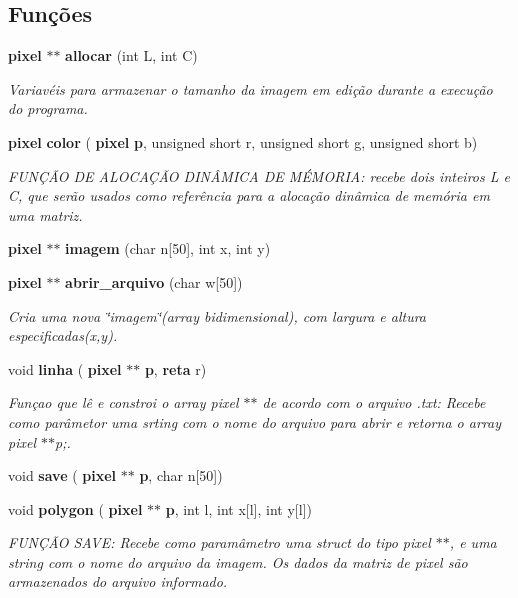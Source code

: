 \subsection*{Funções}
\begin{DoxyCompactItemize}
\item 
\textbf{ pixel} $\ast$$\ast$ \textbf{ allocar} (int L, int C)
\begin{DoxyCompactList}\small\item\em Variavéis para armazenar o tamanho da imagem em edição durante a execução do programa. \end{DoxyCompactList}\item 
\textbf{ pixel} \textbf{ color} (\textbf{ pixel} \textbf{ p}, unsigned short r, unsigned short g, unsigned short b)
\begin{DoxyCompactList}\small\item\em F\+U\+NÇÃO DE A\+L\+O\+C\+AÇÃO D\+I\+NÂ\+M\+I\+CA DE MÉ\+M\+O\+R\+IA\+: recebe dois inteiros L e C, que serão usados como referência para a alocação dinâmica de memória em uma matriz. \end{DoxyCompactList}\item 
\textbf{ pixel} $\ast$$\ast$ \textbf{ imagem} (char n[50], int x, int y)
\item 
\textbf{ pixel} $\ast$$\ast$ \textbf{ abrir\+\_\+arquivo} (char w[50])
\begin{DoxyCompactList}\small\item\em Cria uma nova \char`\"{}imagem\char`\"{}(array bidimensional), com largura e altura especificadas(x,y). \end{DoxyCompactList}\item 
void \textbf{ linha} (\textbf{ pixel} $\ast$$\ast$\textbf{ p}, \textbf{ reta} r)
\begin{DoxyCompactList}\small\item\em Funçao que lê e constroi o array pixel $\ast$$\ast$ de acordo com o arquivo .txt\+: Recebe como parâmetor uma srting com o nome do arquivo para abrir e retorna o array pixel $\ast$$\ast$p;. \end{DoxyCompactList}\item 
void \textbf{ save} (\textbf{ pixel} $\ast$$\ast$\textbf{ p}, char n[50])
\item 
void \textbf{ polygon} (\textbf{ pixel} $\ast$$\ast$\textbf{ p}, int l, int x[l], int y[l])
\begin{DoxyCompactList}\small\item\em F\+U\+NÇÃO S\+A\+VE\+: Recebe como paramâmetro uma struct do tipo pixel $\ast$$\ast$, e uma string com o nome do arquivo da imagem. Os dados da matriz de pixel são armazenados do arquivo informado. \end{DoxyCompactList}\item 

\end{DoxyCompactItemize}
